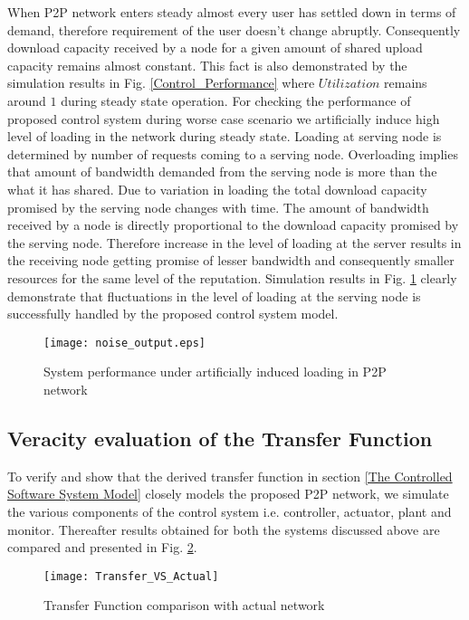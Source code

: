 \documentclass[journal]{IEEEtran}
\begin{document}
When P2P network enters steady almost every user has settled down in terms of demand, therefore requirement of the user doesn't change abruptly. Consequently download capacity received by a node for a given amount of shared upload capacity remains almost constant. This fact is also demonstrated by the simulation results in Fig. \ref{Control_Performance} where $Utilization$ remains around $1$ during steady state operation. For checking the performance of proposed control system during worse case scenario we artificially induce high level of loading in the network during steady state. Loading at serving node is determined by number of requests coming to a serving node. Overloading implies that amount of bandwidth demanded from the serving node is more than the what it has shared. Due to variation in loading the total download capacity promised by the serving node changes with time. The amount of bandwidth received by a node is directly proportional to the download capacity promised by the serving node. Therefore increase in the level of loading at the server results in the receiving node getting promise of lesser bandwidth and consequently smaller resources for the same level of the reputation.
Simulation results in Fig. \ref{ServiceRate} clearly demonstrate that fluctuations in the level of loading at the serving node is successfully handled by the proposed control system model. \begin{figure}[!t]
	\begin{center}
		\texttt{[image: noise\_output.eps]}
		\caption{System performance under artificially induced loading in P2P network}
		\label{ServiceRate}
	\end{center}
\end{figure}
\subsection{Veracity evaluation of the Transfer Function}
\label{TF}

To verify and show that the derived transfer function in section \ref{The Controlled Software System Model} closely models the proposed P2P network, we simulate the various components of the control system i.e. controller, actuator, plant and monitor. Thereafter results obtained for both the systems discussed above are compared and presented in Fig. \ref{transfer_function}. 
\begin{figure}[!t]
	\begin{center}
		\texttt{[image: Transfer\_VS\_Actual]}
		\caption{Transfer Function comparison with actual network }
		\label{transfer_function}
	\end{center}
\end{figure}
\end{document}

